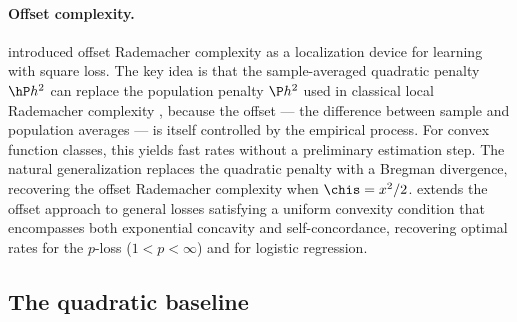 \documentclass{article}
\begin{document}
\paragraph{Offset complexity.}
\citet{liang2015learning}
introduced offset Rademacher complexity
as a localization device
for learning with square loss.
The key idea is that
the sample-averaged quadratic penalty
$\hP h^2$
can replace the population penalty
$\P h^2$ used in
classical local Rademacher complexity
\citep{bartlett2005local},
because the offset --- the
difference between sample and population
averages --- is itself controlled
by the empirical process.
For convex function classes,
this yields fast rates
without a preliminary estimation step.
The natural generalization replaces
the quadratic penalty
with a Bregman divergence,
recovering the offset Rademacher complexity
when $\chis = x^2/2$.
\citet{vijaykumar2021localization}
extends the offset approach
to general losses
satisfying a uniform convexity condition
that encompasses both
exponential concavity
and self-concordance,
recovering optimal rates
for the $p$-loss ($1 < p < \infty$)
and for logistic regression.

\subsection{The quadratic baseline}
\label{sec:quadratic-baseline}
\end{document}
